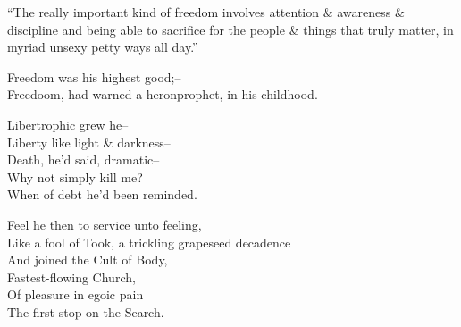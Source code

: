 \secdiv

``The really important kind of freedom involves attention \& awareness \& discipline and being able to sacrifice for the people \& things that truly matter, in myriad unsexy petty ways all day.''

Freedom was his highest good;-- \\
Freedoom, had warned a heronprophet, in his childhood. 

Libertrophic grew he-- \\
Liberty like light \& darkness-- \\
Death, he'd said, dramatic-- \\
Why not simply kill me? \\
When of debt he'd been reminded.

Feel he then to service unto feeling, \\
Like a fool of Took, a trickling grapeseed decadence \\
And joined the Cult of Body, \\
Fastest-flowing Church, \\
Of pleasure in egoic pain \\
The first stop on the Search.